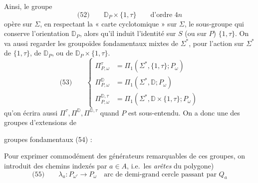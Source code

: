 \documentclass[11pt,a4paper]{article}
\begin{document}
Ainsi, le groupe
\[
  \text{(52)} \qquad \mathbb{D}_P \times \{1, \tau\} \qquad \text{d'ordre } 4n
\]
opère sur $\Sigma$, en respectant la « carte cyclotomique » sur $\Sigma$, le
sous-groupe qui conserve l'orientation  $\mathbb{D}_P$, alors
qu'il induit l'identité sur $S$ (ou sur $P$)  $\{1, \tau\}$.
On va aussi regarder les groupoïdes fondamentaux mixtes de $\Sigma^{*}$, pour
l'action sur $\Sigma^{*}$ de $\{1, \tau\}$, de $\mathbb{D}_P$, ou de
$\mathbb{D}_P \times \{1, \tau\}$.  
\[
  \text{(53)} \qquad
  \left\{
  \begin{aligned}
    \Pi_{P,\omega}^{\tau} &= \Pi_1(\Sigma^{*}, \{1, \tau\}; P_\omega) \\
    \Pi_{P,\omega}^{\mathbb{D}} &= \Pi_1(\Sigma^{*}, \mathbb{D}; P_\omega) \\
    \Pi_{P,\omega}^{\mathbb{D},\tau} &= \Pi_1(\Sigma^{*}, \mathbb{D} \times \{1, \tau\}; P_\omega)
  \end{aligned}
  \right.
\]
qu'on écrira aussi $\Pi^\tau, \Pi^{\mathbb{D}}, \Pi^{\mathbb{D},\tau}$ quand $P$
est sous-entendu. On a donc  une des groupes d'extensions de

groupes fondamentaux (54) :



Pour exprimer commodément des générateurs remarquables de ces groupes, on
introduit des chemins \add{\struck{\ill{}}}  \struck{\ill{}}
indexés par $a \in A$, i.e.\ les \emph{arêtes} du polygone)
\[
  \text{(55)} \qquad \lambda_a : P_{\omega'} \longrightarrow P_\omega
  \quad \text{arc de demi-grand cercle passant par } Q_a
\]
\end{document}
